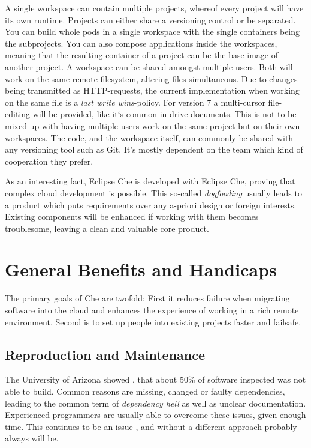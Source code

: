 \documentclass[utf8]{lni}
\begin{document}
A single workspace can contain multiple projects, whereof every project will have its own runtime. 
Projects can either share a versioning control or be separated. 
You can build whole pods in a single workspace with the single containers being the subprojects. 
You can also compose applications inside the workspaces, meaning that the resulting 
container of a project can be the base-image of another project. 
A workspace can be shared amongst multiple users. 
Both will work on the same remote filesystem, altering files simultaneous. 
Due to changes being transmitted as HTTP-requests, the current implementation when working on the same file is a \textit{last write wins}-policy. 
For version 7 a multi-cursor file-editing will be provided, like it`s common in 
drive-documents. 
This is not to be mixed up with having multiple users work on the same project but on their own workspaces. 
The code, and the workspace itself, can commonly be shared with any versioning tool such as Git.
It's mostly dependent on the team which kind of cooperation they prefer. 

As  an  interesting  fact,  Eclipse  Che  is  developed  with Eclipse Che, proving that complex cloud development is possible. 
This so-called \textit{dogfooding} usually leads to a product which puts requirements over any a-priori design or foreign interests.  
Existing components will be enhanced if working with them becomes troublesome, leaving a clean and valuable core product. 

\section{General Benefits and Handicaps}
\label{sec:Eval}
The primary goals of Che are twofold: 
First it reduces failure when migrating software into the cloud and enhances the experience of working in a rich remote environment.
Second is to set up people into existing projects faster and failsafe.

\subsection{Reproduction and Maintenance}
The University of Arizona showed \cite{CO16}, that about 50\% of software inspected was not able to build. 
Common reasons are missing, changed or faulty dependencies, leading to the common term of \textit{dependency hell} as well as unclear documentation. 
Experienced programmers are usually able to overcome these issues, given enough time. This continues to be an issue \cite{CL14}, and without a different approach probably always will be. 
\end{document}
